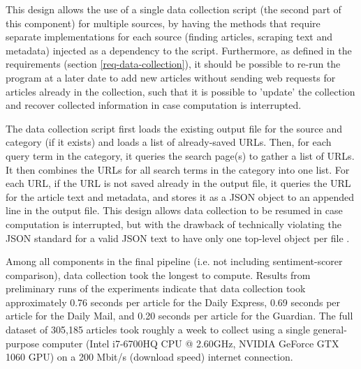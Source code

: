 \documentclass{report}
\begin{document}
This design allows the use of a single data collection script (the second part of this component) for multiple sources, by having the methods that require separate implementations for each source (finding articles, scraping text and metadata) injected as a dependency to the script.
Furthermore, as defined in the requirements (section \ref{req-data-collection}), it should be possible to re-run the program at a later date to add new articles without sending web requests for articles already in the collection, such that it is possible to 'update' the collection and recover collected information in case computation is interrupted.

The data collection script first loads the existing output file for the source and category (if it exists) and loads a list of already-saved URLs.
Then, for each query term in the category, it queries the search page(s) to gather a list of URLs.
It then combines the URLs for all search terms in the category into one list.
For each URL, if the URL is not saved already in the output file, it queries the URL for the article text and metadata, and stores it as a JSON object to an appended line in the output file.
This design allows data collection to be resumed in case computation is interrupted, but with the drawback of technically violating the JSON standard for a valid JSON text to have only one top-level object per file \cite{rfc8259}.

Among all components in the final pipeline (i.e. not including sentiment-scorer comparison), data collection took the longest to compute.
Results from preliminary runs of the experiments indicate that data collection took approximately 0.76 seconds per article for the Daily Express, 0.69 seconds per article for the Daily Mail, and 0.20 seconds per article for the Guardian.
The full dataset of 305,185 articles took roughly a week to collect using a single general-purpose computer (Intel i7-6700HQ CPU @ 2.60GHz, NVIDIA GeForce GTX 1060 GPU) on a 200 Mbit/s (download speed) internet connection.
\end{document}
